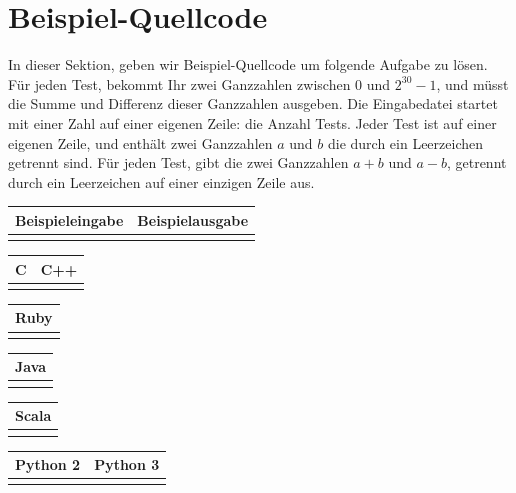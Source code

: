 \section{Beispiel-Quellcode}
\label{codeexamples}

In dieser Sektion, geben wir Beispiel-Quellcode um folgende Aufgabe zu lösen.
Für jeden Test, bekommt Ihr zwei Ganzzahlen zwischen 0 und $2^{30}-1$,
und müsst die Summe und Differenz dieser Ganzzahlen ausgeben.
Die Eingabedatei startet mit einer Zahl auf einer eigenen Zeile: die Anzahl Tests.
Jeder Test ist auf einer eigenen Zeile, und enthält zwei Ganzzahlen $a$ und $b$
die durch ein Leerzeichen getrennt sind.
Für jeden Test, gibt die zwei Ganzzahlen $a+b$ und $a-b$, getrennt durch ein Leerzeichen auf einer einzigen Zeile aus.

\begin{tabular}{|p{}|p{}|}
\hline
\textbf{Beispieleingabe} & \textbf{Beispielausgabe} \\
\hline
 &
 \\
\hline
\end{tabular}

\begin{tabular}{|p{}|p{}|}
\hline
\textbf{C} & \textbf{C++} \\
\hline
&
\\
\hline
\end{tabular}

\begin{tabular}{|p{}|}
\hline
\textbf{Ruby}\\
\hline
\\
\hline
\end{tabular}


\begin{tabular}{|p{}|}
\hline
\textbf{Java}\\
\hline
\\
\hline
\end{tabular}

\begin{tabular}{|p{}|}
\hline
\textbf{Scala}\\
\hline
\\
\hline
\end{tabular}

\begin{tabular}{|p{}|p{}|}
\hline
\textbf{Python 2} & \textbf{Python 3} \\
\hline
&
\\
\hline
\end{tabular}



